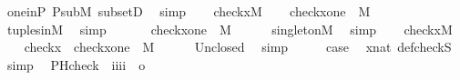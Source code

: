 \begin{isabellebody}
\ one{\isacharunderscore}{\kern0pt}in{\isacharunderscore}{\kern0pt}P\ P{\isacharunderscore}{\kern0pt}sub{\isacharunderscore}{\kern0pt}M\ subsetD\ \isamarkupfalse%
\ simp\isanewline
\ \ \isamarkupfalse%
\ {\isacartoucheopen}check{\isacharparenleft}{\kern0pt}x{\isacharparenright}{\kern0pt}{\isasymin}M{\isacartoucheclose}\isanewline
\ \ \isamarkupfalse%
\ {\isachardoublequoteopen}{\isasymlangle}check{\isacharparenleft}{\kern0pt}x{\isacharparenright}{\kern0pt}{\isacharcomma}{\kern0pt}one{\isasymrangle}\ {\isasymin}\ M{\isachardoublequoteclose}\isanewline
\ \ \ \ \isamarkupfalse%
\ tuples{\isacharunderscore}{\kern0pt}in{\isacharunderscore}{\kern0pt}M\ \isamarkupfalse%
\ simp\isanewline
\ \ \isamarkupfalse%
\isanewline
\ \ \isamarkupfalse%
\ {\isachardoublequoteopen}{\isacharbraceleft}{\kern0pt}{\isasymlangle}check{\isacharparenleft}{\kern0pt}x{\isacharparenright}{\kern0pt}{\isacharcomma}{\kern0pt}one{\isasymrangle}{\isacharbraceright}{\kern0pt}\ {\isasymin}\ M{\isachardoublequoteclose}\isanewline
\ \ \ \ \isamarkupfalse%
\ singletonM\ \isamarkupfalse%
\ simp\isanewline
\ \ \isamarkupfalse%
\ {\isacartoucheopen}check{\isacharparenleft}{\kern0pt}x{\isacharparenright}{\kern0pt}{\isasymin}M{\isacartoucheclose}\isanewline
\ \ \isamarkupfalse%
\ {\isachardoublequoteopen}check{\isacharparenleft}{\kern0pt}x{\isacharparenright}{\kern0pt}\ {\isasymunion}\ {\isacharbraceleft}{\kern0pt}{\isasymlangle}check{\isacharparenleft}{\kern0pt}x{\isacharparenright}{\kern0pt}{\isacharcomma}{\kern0pt}one{\isasymrangle}{\isacharbraceright}{\kern0pt}\ {\isasymin}\ M{\isachardoublequoteclose}\isanewline
\ \ \ \ \isamarkupfalse%
\ Un{\isacharunderscore}{\kern0pt}closed\ \isamarkupfalse%
\ simp\isanewline
\ \ \isamarkupfalse%
\ \isamarkupfalse%
\ {\isacharquery}{\kern0pt}case\ \isamarkupfalse%
\ {\isacartoucheopen}x{\isasymin}nat{\isacartoucheclose}\ def{\isacharunderscore}{\kern0pt}checkS\ \isamarkupfalse%
\ simp\isanewline
{}\isamarkupfalse%
%
\endisatagproof
{\isafoldproof}%
%
\isadelimproof
\isanewline
%
\endisadelimproof
\isanewline
\isanewline
{}\isamarkupfalse%
\isanewline
\ \ PHcheck\ {\isacharcolon}{\kern0pt}{\isacharcolon}{\kern0pt}\ {\isachardoublequoteopen}{\isacharbrackleft}{\kern0pt}i{\isacharcomma}{\kern0pt}i{\isacharcomma}{\kern0pt}i{\isacharcomma}{\kern0pt}i{\isacharbrackright}{\kern0pt}\ {\isasymRightarrow}\ o{\isachardoublequoteclose}\ \isanewline

\end{isabellebody}
